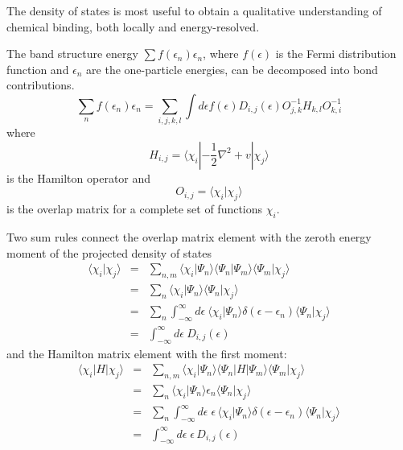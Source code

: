 \documentclass[final,12pt,makeidx,DIV=calc]{article}
\begin{document}
{{{{{{The density of states is most useful to obtain a qualitative
understanding of chemical binding, both locally and energy-resolved.

The band structure energy $\sum f(\epsilon_n)\epsilon_n$, where
$f(\epsilon)$ is the Fermi distribution function and $\epsilon_n$ are
the one-particle energies, can be decomposed into bond
contributions. 
\begin{equation}
\sum_n f(\epsilon_n)\epsilon_n 
= \sum_{i,j,k,l} \int d\epsilon f(\epsilon)
D_{i,j}(\epsilon) O^{-1}_{j,k} H_{k,l}O^{-1}_{k,i}
\label{eq:dosebandeq1}
\end{equation}
where 
\begin{equation}
H_{i,j}=\langle\chi_i|-\frac{1}{2}\nabla^2+v|\chi_j\rangle
\end{equation}
is the Hamilton operator and 
\begin{equation}
O_{i,j}=\langle\chi_i|\chi_j\rangle
\end{equation}
is the overlap matrix for a complete set of functions $\chi_i$.

Two sum rules connect the overlap matrix element
with the zeroth energy moment of the projected density of states
\begin{eqnarray}
\langle\chi_i|\chi_j\rangle&=&\sum_{n,m}
\langle\chi_i|\Psi_n\rangle\langle\Psi_n|\Psi_m\rangle\langle\Psi_m|\chi_j\rangle
\nonumber\\
&=&\sum_{n}\langle\chi_i|\Psi_n\rangle   \langle\Psi_n|\chi_j\rangle
\nonumber\\
&=&\sum_{n}\int_{-\infty}^{\infty} d\epsilon\ 
\langle\chi_i|\Psi_n\rangle\delta(\epsilon-\epsilon_n)
\langle\Psi_n|\chi_j\rangle
\nonumber\\
&=&\int_{-\infty}^{\infty} d\epsilon\  D_{i,j}(\epsilon)
\label{eq:dossumruleo}
\end{eqnarray}
and the Hamilton matrix element with the first moment:
\begin{eqnarray}
\langle\chi_i|H|\chi_j\rangle&=&\sum_{n,m}
\langle\chi_i|\Psi_n\rangle\langle\Psi_n|H|\Psi_m\rangle\langle\Psi_m|\chi_j\rangle
\nonumber\\
&=&\sum_{n}\langle\chi_i|\Psi_n\rangle  \epsilon_n \langle\Psi_n|\chi_j\rangle
\nonumber\\
&=&\sum_{n}\int_{-\infty}^{\infty} d\epsilon\;\epsilon\,
\langle\chi_i|\Psi_n\rangle\delta(\epsilon-\epsilon_n)
\langle\Psi_n|\chi_j\rangle
\nonumber\\
&=&\int_{-\infty}^{\infty} d\epsilon\;\epsilon\, D_{i,j}(\epsilon)
\label{eq:dossumruleh}
\end{eqnarray}

}}}}}}
\end{document}
